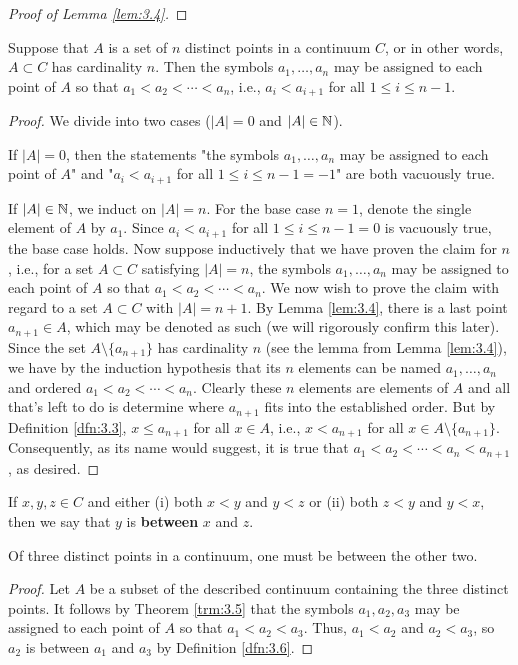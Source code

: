 \documentclass[../main.tex]{subfiles}
\begin{document}
\begin{lemma}
\begin{proof}[Proof of Lemma \ref{lem:3.4}]
    \end{proof}
\end{lemma}

\begin{theorem}\label{trm:3.5}
    Suppose that $A$ is a set of $n$ distinct points in a continuum $C$, or in other words, $A\subset C$ has cardinality $n$. Then the symbols $a_1,\dots,a_n$ may be assigned to each point of $A$ so that $a_1<a_2<\cdots<a_n$, i.e., $a_i<a_{i+1}$ for all $1\leq i\leq n-1$.
    \begin{proof}
        We divide into two cases ($|A|=0$ and $|A|\in\mathbb{N}$).\par
        If $|A|=0$, then the statements "the symbols $a_1,\dots,a_n$ may be assigned to each point of $A$" and "$a_i<a_{i+1}$ for all $1\leq i\leq n-1=-1$" are both vacuously true.\par
        If $|A|\in\mathbb{N}$, we induct on $|A|=n$. For the base case $n=1$, denote the single element of $A$ by $a_1$. Since $a_i<a_{i+1}$ for all $1\leq i\leq n-1=0$ is vacuously true, the base case holds. Now suppose inductively that we have proven the claim for $n$, i.e., for a set $A\subset C$ satisfying $|A|=n$, the symbols $a_1,\dots,a_n$ may be assigned to each point of $A$ so that $a_1<a_2<\cdots<a_n$. We now wish to prove the claim with regard to a set $A\subset C$ with $|A|=n+1$. By Lemma \ref{lem:3.4}, there is a last point $a_{n+1}\in A$, which may be denoted as such (we will rigorously confirm this later). Since the set $A\setminus\{a_{n+1}\}$ has cardinality $n$ (see the lemma from Lemma \ref{lem:3.4}), we have by the induction hypothesis that its $n$ elements can be named $a_1,\dots,a_n$ and ordered $a_1<a_2<\cdots<a_n$. Clearly these $n$ elements are elements of $A$ and all that's left to do is determine where $a_{n+1}$ fits into the established order. But by Definition \ref{dfn:3.3}, $x\leq a_{n+1}$ for all $x\in A$, i.e., $x<a_{n+1}$ for all $x\in A\setminus\{a_{n+1}\}$. Consequently, as its name would suggest, it is true that $a_1<a_2<\cdots<a_n<a_{n+1}$, as desired.
    \end{proof}
\end{theorem}

\begin{definition}\label{dfn:3.6}
    If $x,y,z\in C$ and either (i) both $x<y$ and $y<z$ or (ii) both $z<y$ and $y<x$, then we say that $y$ is \textbf{between} $x$ and $z$.
\end{definition}

\begin{corollary}\label{cly:3.7}
    Of three distinct points in a continuum, one must be between the other two.
    \begin{proof}
        Let $A$ be a subset of the described continuum containing the three distinct points. It follows by Theorem \ref{trm:3.5} that the symbols $a_1,a_2,a_3$ may be assigned to each point of $A$ so that $a_1<a_2<a_3$. Thus, $a_1<a_2$ and $a_2<a_3$, so $a_2$ is between $a_1$ and $a_3$ by Definition \ref{dfn:3.6}.
    \end{proof}
\end{corollary}
\end{document}
